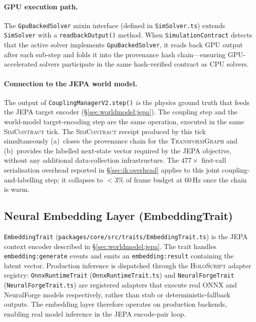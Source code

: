 \documentclass[sigconf,nonacm]{acmart}
\newcommand{\holoscript}{\textsc{HoloScript}}
\newcommand{\transformgraph}{\textsc{TransformGraph}}
\newcommand{\simcontract}{\textsc{SimContract}}
\begin{document}
\paragraph{GPU execution path.}
The \texttt{GpuBackedSolver} mixin interface (defined in
\texttt{SimSolver.ts}) extends \texttt{SimSolver} with a
\texttt{readbackOutput()} method.  When \texttt{SimulationContract}
detects that the active solver implements \texttt{GpuBackedSolver}, it
reads back GPU output after each sub-step and folds it into the
provenance hash chain---ensuring GPU-accelerated solvers participate in
the same hash-verified contract as CPU solvers.

\paragraph{Connection to the JEPA world model.}
The output of \texttt{CouplingManagerV2.step()} \emph{is} the physics
ground truth that feeds the JEPA target encoder
(\S\ref{sec:worldmodel:jepa}).
The coupling step and the world-model target-encoding step are the
same operation, executed in the same \simcontract{} tick.
The \simcontract{} receipt produced by this tick simultaneously
(a)~closes the provenance chain for the \transformgraph{} and
(b)~provides the labelled next-state vector required by the JEPA
objective, without any additional data-collection infrastructure.
The $477\times$ first-call serialisation overhead reported in
\S\ref{sec:ik:overhead} applies to this joint coupling-and-labelling
step; it collapses to $<3\%$ of frame budget at 60\,Hz once the
chain is warm.

\subsection{Neural Embedding Layer (EmbeddingTrait)}
\label{sec:worldmodel:embedding}

\texttt{EmbeddingTrait}
(\texttt{packages/core/src/traits/EmbeddingTrait.ts}) is the JEPA
context encoder described in \S\ref{sec:worldmodel:jepa}.  The trait
handles \texttt{embedding:generate} events and emits an
\texttt{embedding:result} containing the latent vector.  Production
inference is dispatched through the \holoscript{} adapter registry:
\texttt{OnnxRuntimeTrait} (\texttt{OnnxRuntimeTrait.ts}) and
\texttt{NeuralForgeTrait} (\texttt{NeuralForgeTrait.ts}) are
registered adapters that execute real ONNX and NeuralForge models
respectively, rather than stub or deterministic-fallback outputs.
The embedding layer therefore operates on production backends,
enabling real model inference in the JEPA encode-pair loop.
\end{document}
